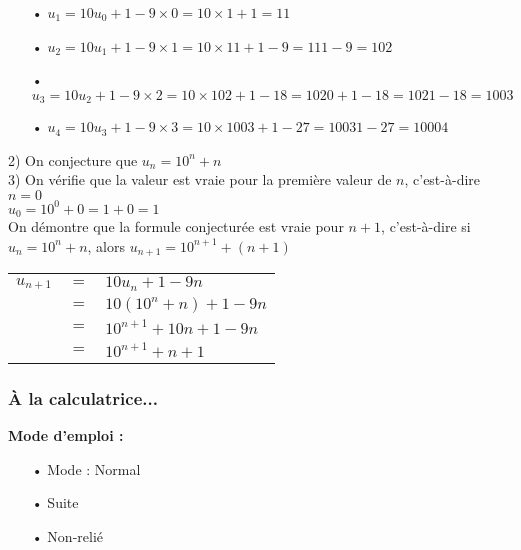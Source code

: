 \begin{itemize}
\item[•] $u_1 = 10u_0 + 1 - 9 \times 0 = 10 \times 1 + 1 = 11$ \\
\item[•] $u_2 = 10u_1 + 1 - 9 \times 1 = 10 \times 11 + 1 - 9 = 111 - 9 = 102$ \\
\item[•] $u_3 = 10u_2 + 1 - 9 \times 2 = 10 \times 102 + 1 - 18 = 1020 + 1 - 18 = 1021 - 18 = 1003 $ \\
\item[•] $u_4 = 10u_3 + 1 - 9 \times 3 = 10 \times 1003 + 1 - 27 = 10031 - 27 = 10004$ \\
\end{itemize}

2) On conjecture que $u_n = 10^n + n$ \\

3) On vérifie que la valeur est vraie pour la première valeur de $n$, c'est-à-dire $n = 0$ \\

$u_0 = 10^0 + 0 = 1 + 0 = 1 $ \\

On démontre que la formule conjecturée est vraie pour $n + 1$, c'est-à-dire si $u_n = 10^n + n$, alors $u_{n+1} = 10^{n+1} + \left(n+1\right)$ \\

\begin{tabular}{lll}
$u_{n+1}$ & $=$ & $10u_n + 1 - 9n$ \\
& $=$ & $10\left(10^n + n\right) + 1 - 9n$ \\
& $=$ & $10^{n+1} + 10n + 1 - 9n $ \\
& $=$ & $10^{n+1} + n + 1$ \\
\end{tabular}

\subsubsection{À la calculatrice...}

\textbf{Mode d'emploi : }

\begin{itemize}
\item[•] Mode : Normal
\item[•] Suite
\item[•] Non-relié
\end{itemize}

\vspace*{.3cm}

